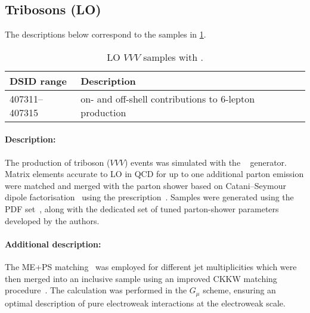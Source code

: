 


\subsection{Tribosons (LO)}

The descriptions below correspond to the samples in
\cref{tab:MB-sherpa-vvvlo}.

\begin{table}[htbp]
  \caption{LO \(VVV\) samples with \SHERPA.}%
  \label{tab:MB-sherpa-vvvlo}
  \centering
  \begin{tabular}{l l}
    \toprule
    DSID range & Description \\
    \midrule
    407311--407315   & on- and off-shell contributions to 6-lepton production\\
    \bottomrule
  \end{tabular}
\end{table}

\paragraph{Description:}

The production of triboson (\(VVV\)) events was simulated with the
\SHERPA[2.2.1]~\cite{Bothmann:2019yzt} generator. Matrix elements accurate to LO in QCD
for up to one additional parton emission were matched and merged with the \SHERPA parton shower based on Catani--Seymour
dipole factorisation~\cite{Gleisberg:2008fv,Schumann:2007mg} using the \MEPSatLO
prescription~\cite{Hoeche:2011fd,Hoeche:2012yf,Catani:2001cc,Hoeche:2009rj}.
Samples were generated using the \NNPDF[3.0nnlo] PDF set~\cite{Ball:2014uwa},
along with the dedicated set of tuned parton-shower parameters
developed by the \SHERPA authors.

\paragraph{Additional description:}

The ME+PS matching~\cite{Hoeche:2011fd} was employed for different jet
multiplicities which were then merged into an inclusive sample
using an improved CKKW matching
procedure~\cite{Catani:2001cc,Hoeche:2009rj}.  The calculation was
performed in the \(G_\mu\) scheme, ensuring an optimal description
of pure electroweak interactions at the electroweak scale.


